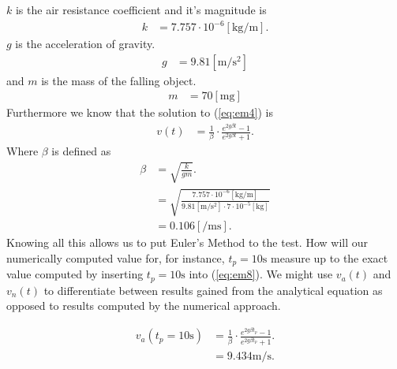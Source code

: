 \documentclass[paper=a4, fontsize=11pt]{scrartcl} %
\numberwithin{equation}{section} %
\numberwithin{figure}{section} %
\numberwithin{table}{section} %
\begin{document}
$k$ is the air resistance coefficient and it's magnitude is
\begin{align} \label{eq:em5}
k &= 7.757 \cdot 10^{-6}[\si{\kilogram\per\meter}].
\end{align}
$g$ is the acceleration of gravity.
\begin{align} \label{eq:em6}
g &= 9.81 [\si{\meter\per\second\squared}]
\end{align}
and $m$ is the mass of the falling object.
\begin{align} \label{eq:em7}
m &= 70 [\si{\milli\gram}]
\end{align}
Furthermore we know that the solution to (\ref{eq:em4}) is
\begin{align}
v(t) &= \frac{1}{\beta} \cdot \frac{e^{2 g \beta t} - 1}{e^{2 g \beta t} + 1}.\label{eq:em8}
\end{align}
Where $\beta$ is defined as
\begin{align} 
\beta &= \sqrt{\frac{k}{gm}}. \\
      &= \sqrt{\frac{7.757 \cdot 10^{-6}[\si{\kilogram\per\meter}]}{9.81 [\si{\meter\per\second\squared}] \cdot 7 \cdot 10^{-5} [\si{\kilo\gram}]}} \\
      &= 0.106 [\si{\per\meter\second}]. \label{eq:em9}
\end{align}
Knowing all this allows us to put Euler's Method to the test. How will our numerically computed value for, for instance, $t_p = 10 \si{\second}$ measure up to the exact value 
computed by inserting $t_p = 10 \si{\second}$ into (\ref{eq:em8}). We might use $v_a(t)$ and $v_n(t)$ to differentiate between results gained from the analytical equation 
as opposed to results computed by the numerical approach. 

\begin{align}
v_a(t_p = 10\si{\second}) &= \frac{1}{\beta} \cdot \frac{e^{2 g \beta t_p} - 1}{e^{2 g \beta t_p} + 1}.\label{eq:em10} \\
 &= 9.434 \si{\meter\per\second}.\label{eq:em11}
\end{align}
\end{document}
